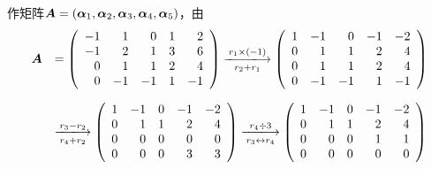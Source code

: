 \begin{frame}[allowframebreaks]
  \begin{jie}
    作矩阵$\boldsymbol{A}=(\boldsymbol{\alpha}_1,\boldsymbol{\alpha}_2,\boldsymbol{\alpha}_3,\boldsymbol{\alpha}_4,\boldsymbol{\alpha}_5)$，由
    $$
    \begin{array}{rl}
      \A &= \left(
           \begin{array}{rrrrr}
             -1&1&0&1&2\\
             -1&2&1&3&6\\
             0&1&1&2&4\\
             0&-1&-1&1&-1
           \end{array}
                        \right) \xlongrightarrow[r_2+r_1]{ r_1\times(-1)}
                        \left(
                        \begin{array}{rrrrr}
                          1&-1&0&-1&-2\\
                          0&1&1&2&4\\
                          0&1&1&2&4\\
                          0&-1&-1&1&-1
                        \end{array}
                                     \right)\\[0.4in]
         &\xlongrightarrow[r_4+r_2]{r_3- r_2}
           \left(
           \begin{array}{rrrrr}
             1&-1&0&-1&-2\\
             0&1&1&2&4\\
             0&0&0&0&0\\
             0&0&0&3&3
           \end{array}
                      \right) \xlongrightarrow[r_3\leftrightarrow r_4]{r_4\div 3}
                      \left(
                      \begin{array}{rrrrr}
                        1&-1&0&-1&-2\\
                        0&1&1&2&4\\
                        0&0&0&1&1\\
                        0&0&0&0&0
                      \end{array}
                                 \right)
    \end{array}
    $$


\end{jie}
\end{frame}
